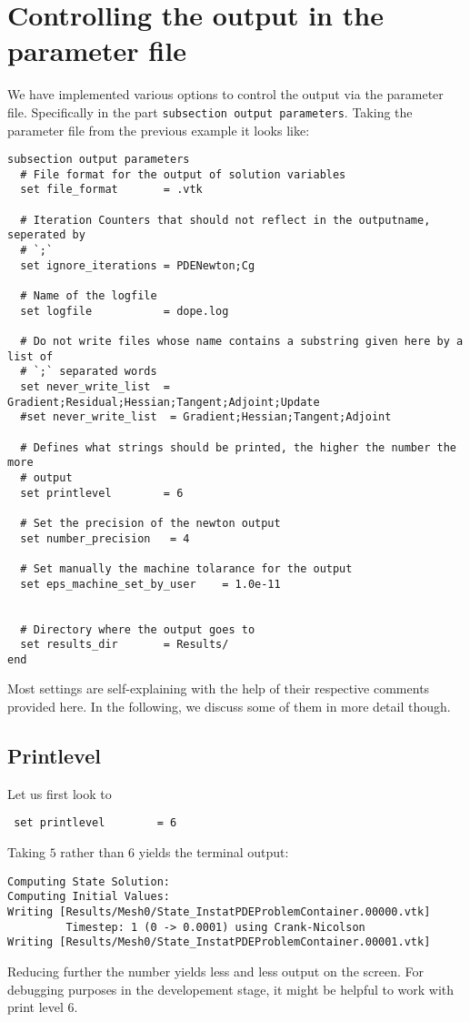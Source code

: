 \section{Controlling the output in the parameter file}
We have implemented various options to control the output via the 
parameter file. Specifically in the part \texttt{subsection output
  parameters}.
Taking the parameter file from the previous example it looks like:
\begin{verbatim}
subsection output parameters
  # File format for the output of solution variables
  set file_format       = .vtk

  # Iteration Counters that should not reflect in the outputname, seperated by
  # `;`
  set ignore_iterations = PDENewton;Cg
  
  # Name of the logfile
  set logfile           = dope.log

  # Do not write files whose name contains a substring given here by a list of
  # `;` separated words
  set never_write_list  = Gradient;Residual;Hessian;Tangent;Adjoint;Update
  #set never_write_list  = Gradient;Hessian;Tangent;Adjoint
      
  # Defines what strings should be printed, the higher the number the more
  # output
  set printlevel        = 6
  
  # Set the precision of the newton output
  set number_precision	 = 4

  # Set manually the machine tolarance for the output
  set eps_machine_set_by_user	 = 1.0e-11


  # Directory where the output goes to
  set results_dir       = Results/
end
\end{verbatim}
Most settings are self-explaining with the help of their respective comments
provided here. In the following, we discuss some of them in more detail though.



\newpage
\subsection{Printlevel}
Let us first look to 
\begin{verbatim}
 set printlevel        = 6
\end{verbatim}
Taking $5$ rather than $6$ yields the terminal output:
\begin{verbatim}
Computing State Solution:
Computing Initial Values:
Writing [Results/Mesh0/State_InstatPDEProblemContainer.00000.vtk]
         Timestep: 1 (0 -> 0.0001) using Crank-Nicolson
Writing [Results/Mesh0/State_InstatPDEProblemContainer.00001.vtk]
\end{verbatim}
Reducing further the number yields less and less output on the screen. 
For debugging purposes in the developement stage, it might be helpful to 
work with print level $6$. 

